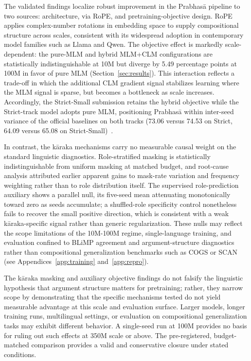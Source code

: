 The validated findings localize robust improvement in the Prabhas\=a pipeline to two sources: architecture, via RoPE, and pretraining-objective design. RoPE applies complex-number rotations in embedding space to supply compositional structure across scales, consistent with its widespread adoption in contemporary model families such as Llama and Qwen. The objective effect is markedly scale-dependent: the pure-MLM and hybrid MLM+CLM configurations are statistically indistinguishable at 10M but diverge by 5.49 percentage points at 100M in favor of pure MLM (Section~\ref{sec:results}). This interaction reflects a trade-off in which the additional CLM gradient signal stabilizes learning where the MLM signal is sparse, but becomes a bottleneck as scale increases. Accordingly, the Strict-Small submission retains the hybrid objective while the Strict-track model adopts pure MLM, positioning Prabhas\=a within inter-seed variance of the official baselines on both tracks (73.06 versus 74.53 on Strict, 64.09 versus 65.08 on Strict-Small)~\cite{Hu2024BabyLM}.

In contrast, the k\=araka mechanisms carry no measurable causal weight on the standard linguistic diagnostics. Role-stratified masking is statistically indistinguishable from uniform masking at matched budget, and root-cause analysis attributed earlier apparent gains to mask-rate variation and frequency weighting rather than to role distribution itself. The supervised role-prediction auxiliary shows a parallel null, its five-seed mean attenuating monotonically toward zero as seeds accumulate; a shuffled-role specificity control nonetheless fails to recover the small positive direction, which is consistent with a weak k\=araka-specific signal rather than generic regularization. These nulls may reflect the scope limitations of the 10M-100M regime, single-language training, and evaluation confined to BLiMP agreement and argument-structure diagnostics rather than compositional generalization benchmarks such as COGS or SCAN (see Appendices~\ref{app:training} and~\ref{app:repro}).

The k\=araka masking and auxiliary objective findings do not falsify the linguistic hypothesis that argument structure matters for pretraining; rather, they narrow scope by demonstrating that the specific mechanisms tested do not yield measurable advantage at this scale and evaluation surface. Larger models, longer training runs, multilingual settings, or evaluation on compositional generalization tasks may exhibit different behavior. A single-seed run at 100M provides no basis for ruling out such effects at 350M scale or above. The pre-registered, budget-matched comparison provides a valid and conservative closure under stated conditions.


